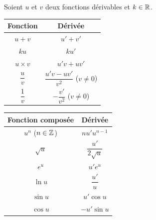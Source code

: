 \begin{propriete}
  Soient $u$ et $v$ deux fonctions d\'{e}rivables et $k \in \mathbb{R}$.

  \bigskip
  \begin{center}
  \renewcommand{\arraystretch}{2.2}
  \begin{tabular}{|c|c|}
    \hline
    \textbf{\color{navy}Fonction}
      & \textbf{\color{navy}D\'{e}riv\'{e}e} \\
    \hline\hline
    $u + v$              & $u' + v'$ \\
    \hline
    $ku$                 & $ku'$ \\
    \hline
    $u \times v$         & $u'v + uv'$ \\
    \hline
    $\dfrac{u}{v}$       & $\dfrac{u'v - uv'}{v^2}$ \quad ($v \neq 0$) \\
    \hline
    $\dfrac{1}{v}$       & $-\dfrac{v'}{v^2}$ \quad ($v \neq 0$) \\
    \hline
  \end{tabular}
  \end{center}
\end{propriete}

\begin{propriete}
  \bigskip
  \begin{center}
  \renewcommand{\arraystretch}{2.2}
  \begin{tabular}{|c|c|}
    \hline
    \textbf{\color{navy}Fonction compos\'{e}e}
      & \textbf{\color{navy}D\'{e}riv\'{e}e} \\
    \hline\hline
    $u^n$ \; ($n \in \mathbb{Z}$)    & $nu'u^{n-1}$ \\
    \hline
    $\sqrt{u}$               & $\dfrac{u'}{2\sqrt{u}}$ \\
    \hline
    $e^u$                    & $u'e^u$ \\
    \hline
    $\ln u$                  & $\dfrac{u'}{u}$ \\
    \hline
    $\sin u$                 & $u'\cos u$ \\
    \hline
    $\cos u$                 & $-u'\sin u$ \\
    \hline
  \end{tabular}
  \end{center}
\end{propriete}


